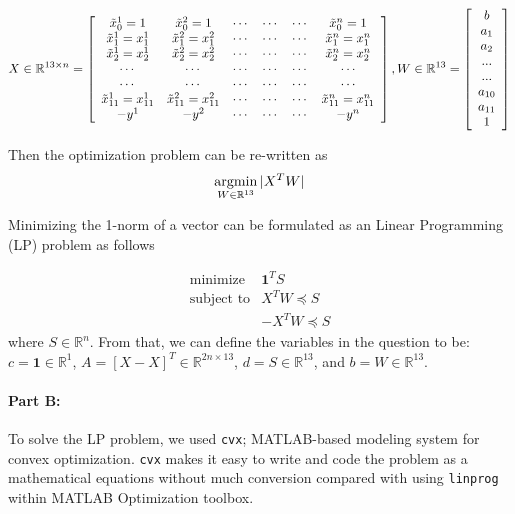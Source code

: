 $$
X\in \mathbb{R}^{13 \times n} = 
\left[
\begin{array}{cc ccc c}
\tilde{x}_{0}^{1} =1 &  \tilde{x}_{0}^{2} =1 & \cdots & \cdots & \cdots &  \tilde{x}_{0}^{n} =1\\
\tilde{x}_{1}^{1} = x_{1}^{1} & \tilde{x}_{1}^{2} = x_{1}^{2} & \cdots & \cdots & \cdots & \tilde{x}_{1}^{n} = x_{1}^{n}\\
\tilde{x}_{2}^{1} = x_{2}^{1} & \tilde{x}_{2}^{2} = x_{2}^{2} & \cdots & \cdots & \cdots & \tilde{x}_{2}^{n} = x_{2}^{n}\\
\cdots & \cdots & \cdots & \cdots & \cdots & \cdots\\
\cdots & \cdots & \cdots & \cdots & \cdots & \cdots\\
\tilde{x}_{11}^{1} = x_{11}^{1} & \tilde{x}_{11}^{2} = x_{11}^{2} & \cdots & \cdots & \cdots & \tilde{x}_{11}^{n} = x_{11}^{n}\\
-y^{1} & -y^{2} & \cdots & \cdots & \cdots & -y^{n}\\
\end{array} 
\right],
W \in \mathbb{R}^{13} =
\left[
\begin{array}{c}
b \\
a_{1} \\
a_{2} \\
...\\
...\\
a_{10} \\
a_{11} \\
1
\end{array} 
\right]
$$

Then the optimization problem can be re-written as 
\[
\operatorname*{argmin}_{W\in \mathbb{R}^{13}} |X^{T}W|
\]

Minimizing the 1-norm of a vector can be formulated as an Linear Programming (LP) problem as follows

\[
\begin{array}{cl}
\text{minimize} &  \mathbf{1}^{T}S\\
\text{subject to} & X^{T}W \preceq S \\
				  & -X^{T}W \preceq S
\end{array} 
\]
where $S\in \mathbb{R}^{n}$. From that, we can define the variables in the question to be: $c = \mathbf{1} \in \mathbb{R}^{1}$, $A = [X -X]^{T} \in \mathbb{R}^{2n\times 13} $, $d = S\in \mathbb{R}^{13}$, and $b = W\in \mathbb{R}^{13}$.


\paragraph{Part B:}
To solve the LP problem, we used \texttt{cvx}; MATLAB-based modeling system for convex optimization. \texttt{cvx} makes it easy to write and code the problem as a mathematical equations without much conversion compared with using \texttt{linprog} within MATLAB Optimization toolbox. 

